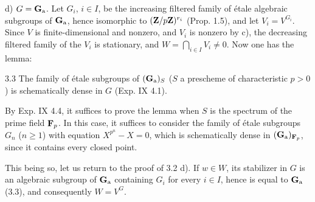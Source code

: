 \noindent d) $G=\mathbf{G}_{\mathrm{a}}$. Let $G_i$, $i\in I$, be the increasing filtered family of étale algebraic subgroups of $\mathbf{G}_{\mathrm{a}}$, hence isomorphic to $(\mathbf{Z}/p\mathbf{Z})^{r_i}$ (Prop. 1.5), and let $V_i=V^{G_i}$. Since $V$ is finite-dimensional and nonzero, and $V_i$ is nonzero by c), the decreasing filtered family of the $V_i$ is stationary, and $W=\bigcap_{i\in I}V_i\neq0$. Now one has the lemma:
\begin{lemma}{3.3}\label{XVII.3.3}
The family of étale subgroups of $(\mathbf{G}_{\mathrm{a}})_S$ ($S$ a prescheme of characteristic $p>0$) is schematically dense in $G$ (Exp. IX 4.1).
\end{lemma}
By Exp. IX 4.4, it suffices to prove the lemma when $S$ is the spectrum of the prime field $\mathbf{F}_p$. In this case, it suffices to consider the family of étale subgroups $G_n$ ($n\geq1$) with equation $X^{p^n}-X=0$, which is schematically dense in $(\mathbf{G}_{\mathrm{a}})_{\mathbf{F}_p}$, since it contains every closed point.

This being so, let us return to the proof of 3.2 d). If $w\in W$, its stabilizer in $G$ is an algebraic subgroup of $\mathbf{G}_{\mathrm{a}}$ containing $G_i$ for every $i\in I$, hence is equal to $\mathbf{G}_{\mathrm{a}}$ (3.3), and consequently $W=V^G$.

